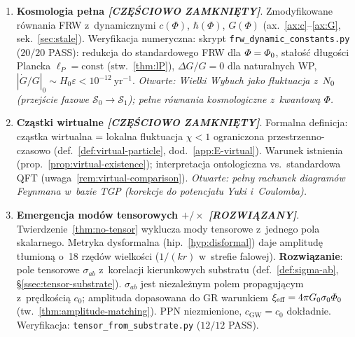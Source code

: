 \begin{enumerate}[label=\textbf{O\arabic*}., start=9, nosep]
  \item \textbf{Kosmologia pe\l{}na
        \emph{[CZ\k{E}\'SCIOWO ZAMKNI\k{E}TY]}}.
        Zmodyfikowane r\'ownania FRW z~dynamicznymi $c(\Phi)$,
        $\hbar(\Phi)$, $G(\Phi)$ (ax.~\ref{ax:c}--\ref{ax:G},
        sek.~\ref{sec:stale}).
        Weryfikacja numeryczna: skrypt
        \texttt{frw\_dynamic\_constants.py} ($20/20$ PASS):
        redukcja do standardowego FRW dla $\varPhi=\varPhi_0$,
        sta\l{}o\'s\'c d\l{}ugo\'sci Plancka $\ell_P = \mathrm{const}$
        (stw.~\ref{thm:lP}), $\Delta G/G = 0$ dla naturalnych WP,
        $|\dot G/G|_0 \sim H_0\varepsilon < 10^{-12}\ \mathrm{yr}^{-1}$.
        \emph{Otwarte: Wielki Wybuch jako fluktuacja z~$N_0$
        (przej\'scie fazowe $\mathcal{S}_0 \to \mathcal{S}_1$);
        pe\l{}ne r\'ownania kosmologiczne z~kwantow\k{a} $\Phi$.}

  \item \textbf{Cz\k{a}stki wirtualne
        \emph{[CZ\k{E}\'SCIOWO ZAMKNI\k{E}TY]}}.
        Formalna definicja: cz\k{a}stka wirtualna = lokalna fluktuacja
        $\chi < 1$ ograniczona przestrzenno-czasowo
        (def.~\ref{def:virtual-particle}, dod.~\ref{app:E-virtual}).
        Warunek istnienia (prop.~\ref{prop:virtual-existence});
        interpretacja ontologiczna vs.\ standardowa QFT
        (uwaga~\ref{rem:virtual-comparison}).
        \emph{Otwarte: pe\l{}ny rachunek diagram\'ow Feynmana
        w~bazie TGP (korekcje do potencja\l{}u Yuki i~Coulomba).}

  \item \textbf{Emergencja mod\'ow tensorowych $+/\times$
        \emph{[ROZWI\k{A}ZANY]}}.
        Twierdzenie~\ref{thm:no-tensor} wyklucza mody tensorowe
        z~jednego pola skalarnego. Metryka dysformalna
        (hip.~\ref{hyp:disformal}) daje amplitud\k{e} t\l{}umion\k{a}
        o~18 rz\k{e}d\'ow wielko\'sci ($1/(kr)$ w~strefie falowej).
        \textbf{Rozwi\k{a}zanie}: pole tensorowe $\sigma_{ab}$
        z~korelacji kierunkowych substratu
        (def.~\ref{def:sigma-ab}, \S\ref{ssec:tensor-substrate}).
        $\sigma_{ab}$ jest niezale\.znym polem propaguj\k{a}cym
        z~pr\k{e}dko\'sci\k{a} $c_0$; amplituda dopasowana do GR
        warunkiem $\xi_{\mathrm{eff}} = 4\pi G_0\sigma_0\varPhi_0$
        (tw.~\ref{thm:amplitude-matching}). PPN niezmienione,
        $c_{\mathrm{GW}} = c_0$ dok\l{}adnie.
        Weryfikacja: \texttt{tensor\_from\_substrate.py} ($12/12$ PASS).


\end{enumerate}
